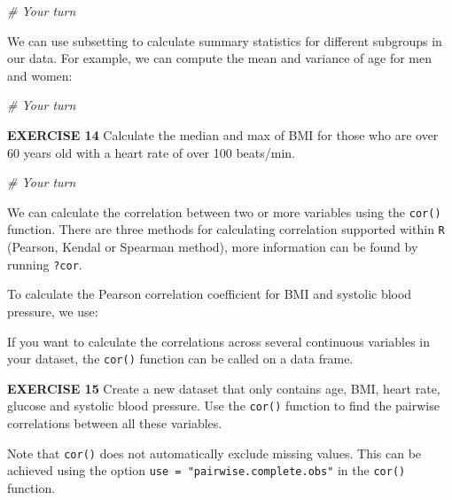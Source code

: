 \documentclass[
]{article}
\newenvironment{Shaded}{\begin{snugshade}}{\end{snugshade}}
\newcommand{\CommentTok}[1]{\textcolor[rgb]{0.56,0.35,0.01}{\textit{#1}}}
\newcommand{\KeywordTok}[1]{\textcolor[rgb]{0.13,0.29,0.53}{\textbf{#1}}}
\newcommand{\NormalTok}[1]{#1}
\newcommand{\OperatorTok}[1]{\textcolor[rgb]{0.81,0.36,0.00}{\textbf{#1}}}
\begin{document}
\begin{Shaded}
\begin{Highlighting}[]
\CommentTok{# Your turn}
\end{Highlighting}
\end{Shaded}

We can use subsetting to calculate summary statistics for different
subgroups in our data. For example, we can compute the mean and variance
of age for men and women:

\begin{Shaded}
\begin{Highlighting}[]
\CommentTok{# Your turn}
\end{Highlighting}
\end{Shaded}

\textbf{EXERCISE 14} Calculate the median and max of BMI for those who
are over 60 years old with a heart rate of over 100 beats/min.

\begin{Shaded}
\begin{Highlighting}[]
\CommentTok{# Your turn}
\end{Highlighting}
\end{Shaded}

We can calculate the correlation between two or more variables using the
\texttt{cor()} function. There are three methods for calculating
correlation supported within \texttt{R} (Pearson, Kendal or Spearman
method), more information can be found by running \texttt{?cor}.

To calculate the Pearson correlation coefficient for BMI and systolic
blood pressure, we use:

\begin{Shaded}
\end{Shaded}

If you want to calculate the correlations across several continuous
variables in your dataset, the \texttt{cor()} function can be called on
a data frame.

\textbf{EXERCISE 15} Create a new dataset that only contains age, BMI,
heart rate, glucose and systolic blood pressure. Use the \texttt{cor()}
function to find the pairwise correlations between all these variables.

Note that \texttt{cor()} does not automatically exclude missing values.
This can be achieved using the option
\texttt{use\ =\ "pairwise.complete.obs"} in the \texttt{cor()} function.
\end{document}
